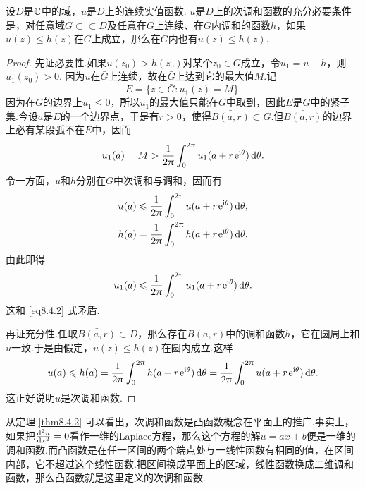 \begin{theorem}\label{thm8.4.2}
  设$D$是$\mathbb C$中的域，$u$是$D$上的连续实值函数. $u$是$D$上的次调和函数的充分必要条件是，对任意域$G\subset\subset D$及任意在$\bar G$上连续、在$G$内调和的函数$h$，如果$u(z)\le h(z)$在$G$上成立，那么在$G$内也有$u(z)\le h(z)$.
\end{theorem}
\begin{proof}
  先证必要性.如果$u(z_0)>h(z_0)$对某个$z_0\in G$成立，令$u_1=u-h$，则$u_1(z_0)>0$. 因为$u$在$\bar G$上连续，故在$\bar G$上达到它的最大值$M$.记
  \[
    E = \{z\in\bar G:u_1(z) = M\}.
  \]
  因为在$G$的边界上$u_1\le0$，所以$u_1$的最大值只能在$G$中取到，因此$E$是$G$中的紧子集.今设$a$是$E$的一个边界点，于是有$r>0$，使得$\bar{B(a,r)}\subset G$.但$\bar{B(a,r)}$的边界上必有某段弧不在$E$中，因而
  \begin{equation}\label{eq8.4.2}
    u_1(a) = M > \frac1{2\uppi}\int_0^{2\uppi}u_1(a+r\operatorname{\!\!\;\mathrm e}^{\mathrm i\theta})\mathop{}\!\mathrm{d} \theta.
  \end{equation}
  令一方面，$u$和$h$分别在$G$中次调和与调和，因而有
  \begin{align*}
    & u(a) \leqslant \frac1{2\uppi}\int_0^{2\uppi}u(a+r\operatorname{\!\!\;\mathrm e}^{\mathrm i\theta})\mathop{}\!\mathrm{d} \theta,\\
    & h(a) = \frac1{2\uppi}\int_0^{2\uppi}h(a+r\operatorname{\!\!\;\mathrm e}^{\mathrm i\theta})\mathop{}\!\mathrm{d} \theta.
  \end{align*}
  由此即得
  \[
    u_1(a) \leqslant \frac1{2\uppi}\int_0^{2\uppi}u_1(a+r\operatorname{\!\!\;\mathrm e}^{\mathrm i\theta})\mathop{}\!\mathrm{d} \theta.
  \]
  这和 \eqref{eq8.4.2} 式矛盾.

  再证充分性.任取$\bar{B(a,r)}\subset D$，那么存在$B(a,r)$中的调和函数$h$，它在圆周上和$u$一致.于是由假定，$u(z)\le h(z)$在圆内成立.这样
  \[
    u(a)\leqslant h(a) = \frac1{2\uppi}\int_0^{2\uppi}h(a+r\operatorname{\!\!\;\mathrm e}^{\mathrm i\theta})\mathop{}\!\mathrm{d} \theta
    = \frac1{2\uppi}\int_0^{2\uppi}u(a+r\operatorname{\!\!\;\mathrm e}^{\mathrm i\theta})\mathop{}\!\mathrm{d} \theta.
  \]
  这正好说明$u$是次调和函数.
\end{proof}

从定理 \ref{thm8.4.2} 可以看出，次调和函数是凸函数概念在平面上的推广.事实上，如果把$\frac{\mathop{}\!\mathrm d^2u}{\mathop{}\!\mathrm dx^2}=0$看作一维的Laplace方程，那么这个方程的解$u=ax+b$便是一维的调和函数.而凸函数是在任一区间的两个端点处与一线性函数有相同的值，在区间内部，它不超过这个线性函数.把区间换成平面上的区域，线性函数换成二维调和函数，那么凸函数就是这里定义的次调和函数.

